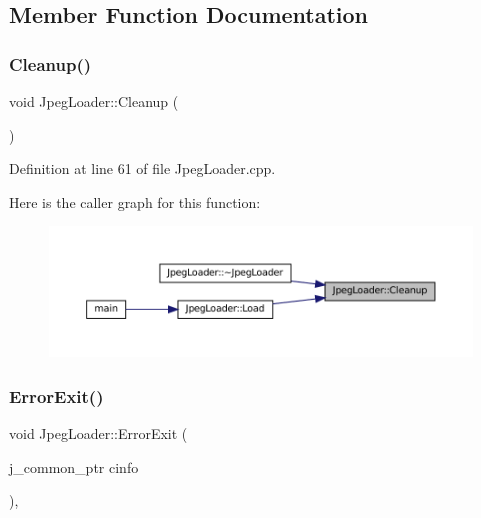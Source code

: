 \subsection{Member Function Documentation}
\mbox{\label{classJpegLoader_a77791c29f6eda95770c36399be96822b}} 
\subsubsection{\texorpdfstring{Cleanup()}{Cleanup()}}
{\footnotesize\ttfamily void Jpeg\+Loader\+::\+Cleanup (\begin{DoxyParamCaption}{ }\end{DoxyParamCaption})\hspace{0.3cm}{\ttfamily [private]}}



Definition at line 61 of file Jpeg\+Loader.\+cpp.

Here is the caller graph for this function\+:
\nopagebreak
\begin{figure}[H]
\begin{center}
\leavevmode
\includegraphics[width=350pt]{classJpegLoader_a77791c29f6eda95770c36399be96822b_icgraph}
\end{center}
\end{figure}
\mbox{\label{classJpegLoader_a689be6001605f12b808d82d49eaaba4e}} 
\subsubsection{\texorpdfstring{ErrorExit()}{ErrorExit()}}
{\footnotesize\ttfamily void Jpeg\+Loader\+::\+Error\+Exit (\begin{DoxyParamCaption}\item[{j\+\_\+common\+\_\+ptr}]{cinfo }\end{DoxyParamCaption})\hspace{0.3cm}{\ttfamily [static]}, {\ttfamily [private]}}



